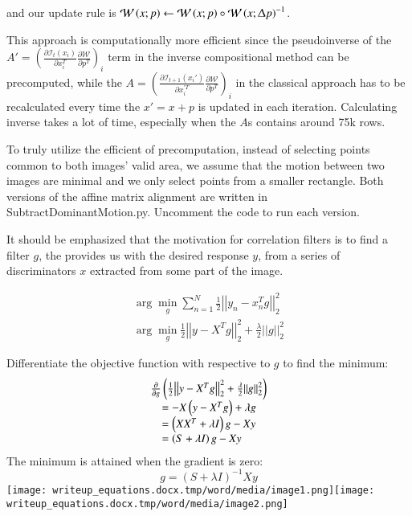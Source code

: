 \documentclass{scrbook}
\begin{document}
and our update rule is $\mathcal{W}\left(x;p\right)\leftarrow \mathcal{W}\left(x;p\right)\circ \mathcal{W}\left(x;\Updelta p\right)^{-1}$. 

This approach is computationally more efficient since the pseudoinverse of the $A'=\left(\frac{\partial \mathcal{I}_{t}\left(x_{i}\right)}{\partial {x}_{i}^{T}}\frac{\partial \mathcal{W}}{\partial p^{T}}\right)_{i}$ term in the inverse compositional method can be precomputed, while the $A=\left(\frac{\partial \mathcal{I}_{t+1}\left(x_{i}'\right)}{\partial {x}_{i}^{'T}}\frac{\partial \mathcal{W}}{\partial p^{T}}\right)_{i}$ in the classical approach has to be recalculated every time the $x'=x+p$ is updated in each iteration. Calculating inverse takes a lot of time, especially when the $A$s contains around 75k rows.

To truly utilize the efficient of precomputation, instead of selecting points common to both images’ valid area, we assume that the motion between two images are minimal and we only select points from a smaller rectangle. Both versions of the affine matrix alignment are written in SubtractDominantMotion.py. Uncomment the code to run each version. 

\pagebreak
It should be emphasized that the motivation for correlation filters is to find a filter $g$, the provides us with the desired response $y$, from a series of discriminators $x$ extracted from some part of the image.

\begin{align*}
\arg \min _{g} {\sum }_{n=1}^{N}\frac{1}{2}{\left| \left| y_{n}-{x}_{n}^{T}g\right| \right| }_{2}^{2} \\
\arg \min _{g} \frac{1}{2}{\left| \left| y-X^{T}g\right| \right| }_{2}^{2}+\frac{\lambda }{2}{\left| \left| g\right| \right| }_{2}^{2} 
\end{align*}

Differentiate the objective function with respective to $g$ to find the minimum:
\begin{equation*}
\begin{array}{ll}
\multicolumn{2}{l}{\frac{\partial }{\partial g}\left(\frac{1}{2}{\left| \left| y-X^{T}g\right| \right| }_{2}^{2}+\frac{\lambda }{2}{\left| \left| g\right| \right| }_{2}^{2}\right)}\\ & =-X\left(y-X^{T}g\right)+\lambda g\\ & =\left(XX^{T}+\lambda I\right)g-Xy\\ & =\left(S+\lambda I\right)g-Xy
\end{array}
\end{equation*}
The minimum is attained when the gradient is zero:
\begin{equation*}
g=\left(S+\lambda I\right)^{-1}Xy
\end{equation*}
\texttt{[image: writeup\_equations.docx.tmp/word/media/image1.png]}\texttt{[image: writeup\_equations.docx.tmp/word/media/image2.png]}
\end{document}
